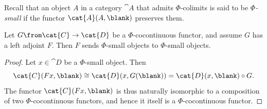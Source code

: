 Recall that an object \(A\) in a category \(\cat{A}\) that admits \(\Phi\)\hyp{}colimits is
said to be \emph{\(\Phi\)\hyp{}small} if the functor \(\cat{A}(A, \blank)\) preserves them.

\begin{lemma}\label{leftadjointssmallobjects}
  Let \(G\from \cat{C} \to \cat{D}\) be a \(\Phi\)\hyp{}cocontinuous functor,
  and assume \(G\) has a left adjoint \(F\).
  Then \(F\) sends \(\Phi\)\hyp{}small objects to \(\Phi\)\hyp{}small objects.
\end{lemma}
\begin{proof}
  Let \(x \in \cat{D}\) be a \(\Phi\)\hyp{}small object.
  Then
  \[
    \cat{C}(Fx,\blank) \cong \cat{D}(x,G(\blank)) = \cat{D}(x,\blank) \circ G.
  \]
  The functor \(\cat{C}(Fx,\blank)\) is thus naturally isomorphic to a composition of two \(\Phi\)\hyp{}cocontinuous functors,
  and hence it itself is a \(\Phi\)\hyp{}cocontinuous functor.
\end{proof}

